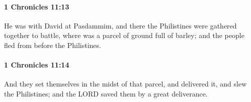 		\paragraph{1 Chronicles 11:13} %
			\label{1CHRONICLES-11-13}

			He was with David at Pasdammim, and there the Philistines were gathered together to battle, where was a parcel of ground full of barley; and the people fled from before the Philistines.


		\paragraph{1 Chronicles 11:14} %
			\label{1CHRONICLES-11-14}

			And they set themselves in the midst of that parcel, and delivered it, and slew the Philistines; and the LORD saved them by a great deliverance.


